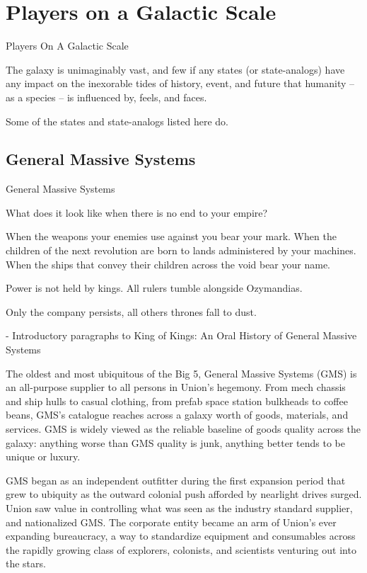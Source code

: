 \section{Players on a Galactic Scale}

Players On A Galactic Scale

The galaxy is unimaginably vast, and few if any states (or state-analogs) have any
impact on the inexorable tides of history, event, and future that humanity -- as a species -- is
influenced by, feels, and faces.

Some of the states and state-analogs listed here do.

\subsection{General Massive Systems}
General Massive Systems

         What does it look like when there is no end to your empire?

         When the weapons your enemies use against you bear your mark. When the children of
         the next revolution are born to lands administered by your machines. When the ships that
         convey their children across the void bear your name.

         Power is not held by kings. All rulers tumble alongside Ozymandias.

         Only the company persists, all others thrones fall to dust.

             -   Introductory paragraphs to King of Kings: An Oral History of General Massive
                 Systems

The oldest and most ubiquitous of the Big 5, General Massive Systems (GMS) is an all-purpose
supplier to all persons in Union’s hegemony. From mech chassis and ship hulls to casual clothing,
from prefab space station bulkheads to coffee beans, GMS’s catalogue reaches across a galaxy
worth of goods, materials, and services. GMS is widely viewed as the reliable baseline of goods
quality across the galaxy: anything worse than GMS quality is junk, anything better tends to be
unique or luxury.

GMS began as an independent outfitter during the first expansion period that grew to ubiquity as
the outward colonial push afforded by nearlight drives surged. Union saw value in controlling what
was seen as the industry standard supplier, and nationalized GMS. The corporate entity became
an arm of Union’s ever expanding bureaucracy, a way to standardize equipment and
consumables across the rapidly growing class of explorers, colonists, and scientists venturing out
into the stars.

